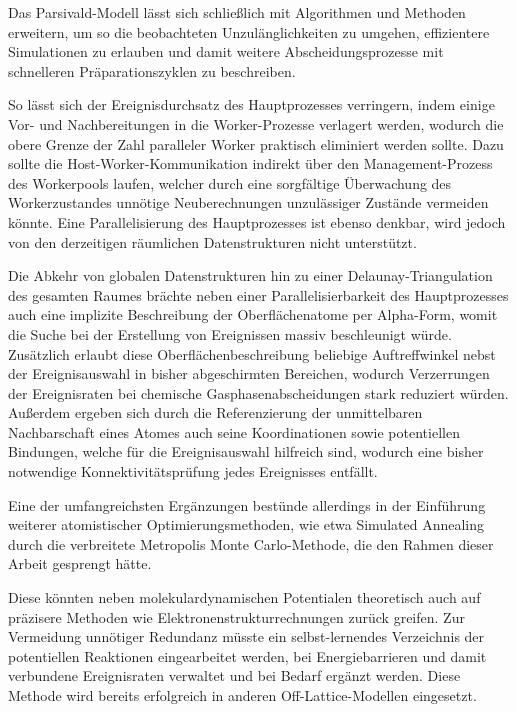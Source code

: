Das Parsivald-Modell lässt sich schließlich mit Algorithmen und Methoden erweitern, um so die beobachteten Unzulänglichkeiten zu umgehen, effizientere Simulationen zu erlauben und damit weitere Abscheidungsprozesse mit schnelleren Präparationszyklen zu beschreiben.

So lässt sich der Ereignisdurchsatz des Hauptprozesses verringern, indem einige Vor- und Nachbereitungen in die Worker-Prozesse verlagert werden, wodurch die obere Grenze der Zahl paralleler Worker praktisch eliminiert werden sollte.
Dazu sollte die Host-\-Worker-\-Kom\-mu\-ni\-ka\-tion indirekt über den Management-Prozess des Workerpools laufen, welcher durch eine sorgfältige Überwachung des Workerzustandes unnötige Neuberechnungen unzulässiger Zustände vermeiden könnte.
Eine Parallelisierung des Hauptprozesses ist ebenso denkbar, wird jedoch von den derzeitigen räumlichen Datenstrukturen nicht unterstützt.

Die Abkehr von globalen Datenstrukturen hin zu einer Delaunay-Triangulation des gesamten Raumes brächte neben einer Parallelisierbarkeit des Hauptprozesses auch eine implizite Beschreibung der Oberflächenatome per Alpha-Form, womit die Suche bei der Erstellung von Ereignissen massiv beschleunigt würde.
Zusätzlich erlaubt diese Oberflächenbeschreibung beliebige Auftreffwinkel nebst der Ereignisauswahl in bisher abgeschirmten Bereichen, wodurch Verzerrungen der Ereignisraten bei chemische Gasphasenabscheidungen stark reduziert würden.
Außerdem ergeben sich durch die Referenzierung der unmittelbaren Nachbarschaft eines Atomes auch seine Koordinationen sowie potentiellen Bindungen, welche für die Ereignisauswahl hilfreich sind, wodurch eine bisher notwendige Konnektivitätsprüfung jedes Ereignisses entfällt.

Eine der umfangreichsten Ergänzungen bestünde allerdings in der Einführung weiterer atomistischer Optimierungsmethoden, wie etwa Simulated Annealing durch die verbreitete Metropolis Monte Carlo-Methode, die den Rahmen dieser Arbeit gesprengt hätte.

Diese könnten neben molekulardynamischen Potentialen theoretisch auch auf präzisere Methoden wie Elektronenstrukturrechnungen zurück greifen.
Zur Vermeidung unnötiger Redundanz müsste ein selbst-lernendes Verzeichnis der potentiellen Reaktionen eingearbeitet werden, bei Energiebarrieren und damit verbundene Ereignisraten verwaltet und bei Bedarf ergänzt werden.
Diese Methode wird bereits erfolgreich in anderen Off-Lattice-Modellen eingesetzt\cite{biehl_off-lattice_2005,stamatakis_graph-theoretical_2011}.

